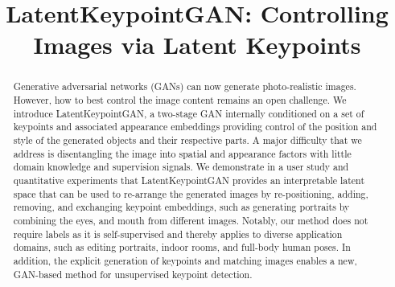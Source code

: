 \documentclass[10pt, conference, compsocconf]{IEEEtran}
\begin{document}
\title{LatentKeypointGAN: Controlling Images via Latent Keypoints}




\author{
}













\maketitle





\IEEEpeerreviewmaketitle


\begin{abstract}
Generative adversarial networks (GANs) can now generate photo-realistic images. However, how to best control the image content remains an open challenge. We introduce LatentKeypointGAN, a two-stage GAN internally conditioned on a set of keypoints and associated appearance embeddings providing control of the position and style of the generated objects and their respective parts. A major difficulty that we address is disentangling the image into spatial and appearance factors with little domain knowledge and supervision signals. We demonstrate in a user study and quantitative experiments that LatentKeypointGAN provides an interpretable latent space that can be used to re-arrange the generated images by re-positioning, adding, removing, and exchanging keypoint embeddings, such as generating portraits by combining the eyes, and mouth from different images. Notably, our method does not require labels as it is self-supervised and thereby applies to diverse application domains, such as editing portraits, indoor rooms, and full-body human poses. In addition, the explicit generation of keypoints and matching images enables a new, GAN-based method for unsupervised keypoint detection.
\end{abstract}
\end{document}
